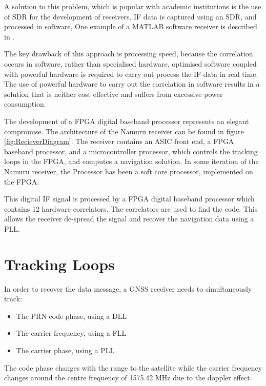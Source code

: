 A solution to this problem, which is popular with academic institutions is the use of \ac{SDR} for the development of receivers. \ac{IF} data is captured using an \ac{SDR}, and processed in software\cite{Glennon11aquariusfirmware}, One example of a MATLAB software receiver is described in \cite{KaiBorre}.

The key drawback of this approach is processing speed, because the correlation occurs in software, rather than specialised hardware, optimised software coupled with powerful hardware is required to carry out process the \ac{IF} data in real time. The use of powerful hardware to carry out the correlation in software results in a solution that is neither cost effective and suffers from excessive power consumption.

The development of a \ac{FPGA} digital baseband processor represents an elegant compromise. 
The architecture of the Namuru receiver can be found in figure \ref{fig:RecieverDiagram}. The receiver contains an ASIC front end, a FPGA baseband processor, and a microcontroller processor, which controls the tracking loops in the FPGA, and computes a navigation solution. In some iteration of the Namuru receiver, the Processor has been a soft core processor, implemented on the \ac{FPGA}.

This digital \ac{IF} signal is processed by a \ac{FPGA} digital baseband processor which contains 12 hardware correlators. The correlators are used to find the code. This allows the receiver de-spread the signal and recover the navigation data using a \ac{PLL}.

\section{Tracking Loops}

In order to recover the data message, a \ac{GNSS} receiver needs to simultaneously track:

\begin{itemize}
\item{The \ac{PRN} code phase, using a \ac{DLL}} 
\item{The carrier frequency, using a \ac{FLL}}
\item{The carrier phase, using a \ac{PLL}}
\end{itemize}


The code phase changes with the range to the satellite while the carrier frequency changes around the centre frequency of 1575.42 MHz due to the doppler effect\cite{Tsui}.

